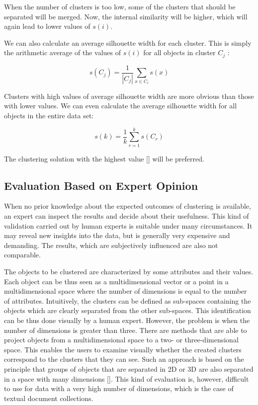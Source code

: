 When the number of clusters is too low, some of the clusters that should be separated will be merged. Now, the internal similarity will be higher, which will again lead to lower values of $s(i)$.

We can also calculate an average silhouette width for each cluster. This is simply the arithmetic average of the values of $s(i)$ for all objects in cluster $C_{j}$ :


\begin{equation*}
s\left(C_{j}\right)=\frac{1}{\left|C_{j}\right|} \sum_{x \in C_{i}} s(x) \tag{12.57}
\end{equation*}


Clusters with high values of average silhouette width are more obvious than those with lower values. We can even calculate the average silhouette width for all objects in the entire data set:


\begin{equation*}
s(k)=\frac{1}{k} \sum_{r=1}^{k} s\left(C_{r}\right) \tag{12.58}
\end{equation*}


The clustering solution with the highest value [\cite{ref8}] will be preferred.

\subsection{Evaluation Based on Expert Opinion}
When no prior knowledge about the expected outcomes of clustering is available, an expert can inspect the results and decide about their usefulness. This kind of validation carried out by human experts is suitable under many circumstances. It may reveal new insights into the data, but is generally very expensive and demanding. The results, which are subjectively influenced are also not comparable.

The objects to be clustered are characterized by some attributes and their values. Each object can be thus seen as a multidimensional vector or a point in a multidimensional space where the number of dimensions is equal to the number of attributes. Intuitively, the clusters can be defined as sub-spaces containing the objects which are clearly separated from the other sub-spaces. This identification can be thus done visually by a human expert. However, the problem is when the number of dimensions is greater than three. There are methods that are able to project objects from a multidimensional space to a two- or three-dimensional space. This enables the users to examine visually whether the created clusters correspond to the clusters that they can see. Such an approach is based on the principle that groups of objects that are separated in 2D or 3D are also separated in a space with many dimensions [\cite{ref122}]. This kind of evaluation is, however, difficult to use for data with a very high number of dimensions, which is the case of textual document collections.

